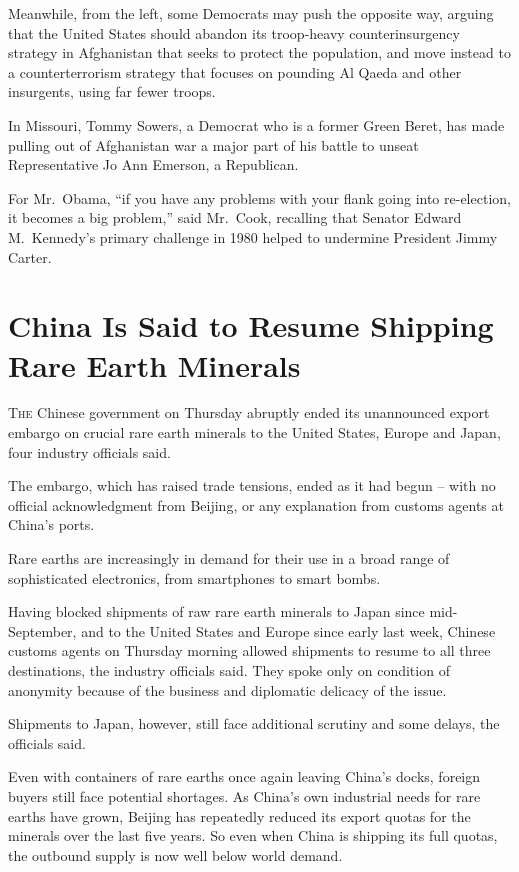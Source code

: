﻿\documentclass[12pt]{article}
\begin{document}
Meanwhile, from the left, some Democrats may push the opposite way, arguing that the United States
should abandon its troop-heavy counterinsurgency strategy in Afghanistan that seeks to protect the
population, and move instead to a counterterrorism strategy that focuses on pounding Al Qaeda and
other insurgents, using far fewer troops.

In Missouri, Tommy Sowers, a Democrat who is a former Green Beret, has made pulling out of
Afghanistan war a major part of his battle to unseat Representative Jo Ann Emerson, a Republican.

For Mr.~Obama, ``if you have any problems with your flank going into re-election, it becomes a big
problem,'' said Mr.~Cook, recalling that Senator Edward M.~Kennedy's primary challenge in 1980
helped to undermine President Jimmy Carter.

\section{China Is Said to Resume Shipping Rare Earth Minerals}

\lettrine{T}{he} Chinese government on Thursday abruptly ended its
unannounced export embargo on crucial rare earth minerals to the United States, Europe and Japan,
four industry officials said.

The embargo, which has raised trade tensions, ended as it had begun -- with no official
acknowledgment from Beijing, or any explanation from customs agents at China's ports.

Rare earths are increasingly in demand for their use in a broad range of sophisticated electronics,
from smartphones to smart bombs.

Having blocked shipments of raw rare earth minerals to Japan since mid-September, and to the United
States and Europe since early last week, Chinese customs agents on Thursday morning allowed
shipments to resume to all three destinations, the industry officials said. They spoke only on
condition of anonymity because of the business and diplomatic delicacy of the issue.

Shipments to Japan, however, still face additional scrutiny and some delays, the officials said.

Even with containers of rare earths once again leaving China's docks, foreign buyers still face
potential shortages. As China's own industrial needs for rare earths have grown, Beijing has
repeatedly reduced its export quotas for the minerals over the last five years. So even when China
is shipping its full quotas, the outbound supply is now well below world demand.
\end{document}
